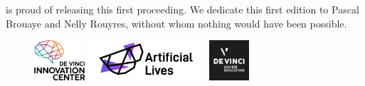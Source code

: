 is proud of releasing this first proceeding. We dedicate this first edition to Pascal Brouaye and Nelly Rouyres, without whom nothing would have been possible.
\begin{figure}[ht!]
	\centering
	\includegraphics[height=1.5cm]{./images/dvic.png}
	\hspace{1cm}
	\includegraphics[height=1.5cm]{./images/AL.png}
	\hspace{1cm}
	\includegraphics[height=1.5cm]{./images/pulv.png}
\end{figure}

\newpage
\paragraph{ }
\newpage
